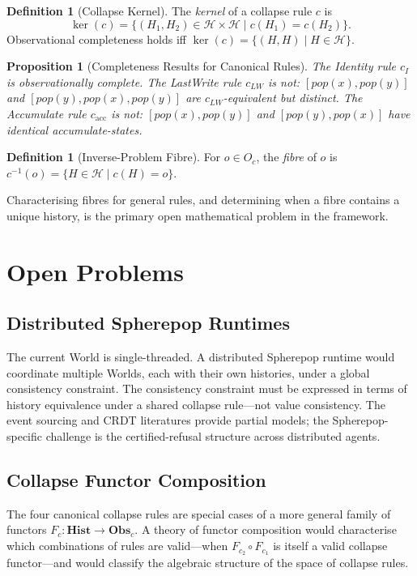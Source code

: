 \documentclass[12pt, a4paper, openany]{book}
\theoremstyle{plain}
\newtheorem{proposition}[theorem]{Proposition}
\theoremstyle{definition}
\newtheorem{definition}[theorem]{Definition}
\theoremstyle{remark}
\newcommand{\Hist}{\mathbf{Hist}}
\newcommand{\Obs}{\mathbf{Obs}}
\newcommand{\calH}{\mathcal{H}}
\begin{document}
\begin{definition}[Collapse Kernel]
The \emph{kernel} of a collapse rule $c$ is
\[
\ker(c) = \{(H_1, H_2) \in \calH \times \calH \mid c(H_1) = c(H_2)\}.
\]
Observational completeness holds iff $\ker(c) = \{(H, H) \mid H \in \calH\}$.
\end{definition}

\begin{proposition}[Completeness Results for Canonical Rules]
The Identity rule $c_I$ is observationally complete. The LastWrite rule $c_{LW}$
is not: $[pop(x), pop(y)]$ and $[pop(y), pop(x), pop(y)]$ are
$c_{LW}$-equivalent but distinct. The Accumulate rule $c_{\mathrm{acc}}$ is not:
$[pop(x), pop(y)]$ and $[pop(y), pop(x)]$ have identical accumulate-states.
\end{proposition}

\begin{definition}[Inverse-Problem Fibre]
For $o \in O_c$, the \emph{fibre} of $o$ is
$c^{-1}(o) = \{H \in \calH \mid c(H) = o\}$.
\end{definition}

Characterising fibres for general rules, and determining when a fibre contains a
unique history, is the primary open mathematical problem in the framework.

\section{Open Problems}

\subsection{Distributed Spherepop Runtimes}

The current World is single-threaded. A distributed Spherepop runtime would
coordinate multiple Worlds, each with their own histories, under a global
consistency constraint. The consistency constraint must be expressed in terms of
history equivalence under a shared collapse rule---not value consistency. The
event sourcing and CRDT literatures provide partial models; the Spherepop-specific
challenge is the certified-refusal structure across distributed agents.

\subsection{Collapse Functor Composition}

The four canonical collapse rules are special cases of a more general family of
functors $F_c : \Hist \to \Obs_c$. A theory of functor composition would
characterise which combinations of rules are valid---when $F_{c_2} \circ F_{c_1}$
is itself a valid collapse functor---and would classify the algebraic structure
of the space of collapse rules.
\end{document}
